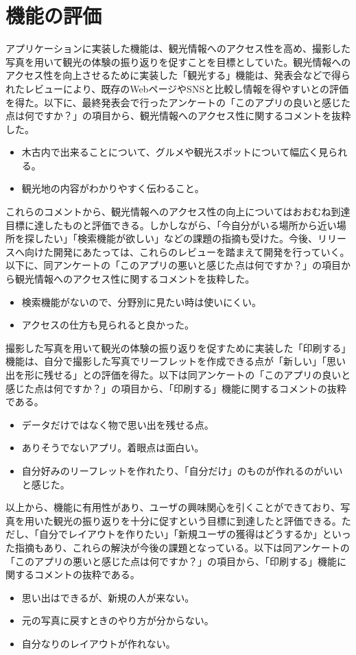 \section{機能の評価}
アプリケーションに実装した機能は、観光情報へのアクセス性を高め、撮影した写真を用いて観光の体験の振り返りを促すことを目標としていた。観光情報へのアクセス性を向上させるために実装した「観光する」機能は、発表会などで得られたレビューにより、既存のWebページやSNSと比較し情報を得やすいとの評価を得た。以下に、最終発表会で行ったアンケートの「このアプリの良いと感じた点は何ですか？」の項目から、観光情報へのアクセス性に関するコメントを抜粋した。
\begin{itemize}
\item 木古内で出来ることについて、グルメや観光スポットについて幅広く見られる。
\item 観光地の内容がわかりやすく伝わること。
\end{itemize}
これらのコメントから、観光情報へのアクセス性の向上についてはおおむね到達目標に達したものと評価できる。しかしながら、「今自分がいる場所から近い場所を探したい」「検索機能が欲しい」などの課題の指摘も受けた。今後、リリースへ向けた開発にあたっては、これらのレビューを踏まえて開発を行っていく。以下に、同アンケートの「このアプリの悪いと感じた点は何ですか？」の項目から観光情報へのアクセス性に関するコメントを抜粋した。
\begin{itemize}
\item 検索機能がないので、分野別に見たい時は使いにくい。
\item アクセスの仕方も見られると良かった。
\end{itemize}
撮影した写真を用いて観光の体験の振り返りを促すために実装した「印刷する」機能は、自分で撮影した写真でリーフレットを作成できる点が「新しい」「思い出を形に残せる」との評価を得た。以下は同アンケートの「このアプリの良いと感じた点は何ですか？」の項目から、「印刷する」機能に関するコメントの抜粋である。
\begin{itemize}
\item データだけではなく物で思い出を残せる点。
\item ありそうでないアプリ。着眼点は面白い。
\item 自分好みのリーフレットを作れたり、「自分だけ」のものが作れるのがいいと感じた。
\end{itemize}
以上から、機能に有用性があり、ユーザの興味関心を引くことができており、写真を用いた観光の振り返りを十分に促すという目標に到達したと評価できる。ただし、「自分でレイアウトを作りたい」「新規ユーザの獲得はどうするか」といった指摘もあり、これらの解決が今後の課題となっている。以下は同アンケートの「このアプリの悪いと感じた点は何ですか？」の項目から、「印刷する」機能に関するコメントの抜粋である。
\begin{itemize}
\item 思い出はできるが、新規の人が来ない。
\item 元の写真に戻すときのやり方が分からない。
\item 自分なりのレイアウトが作れない。
\end{itemize}

